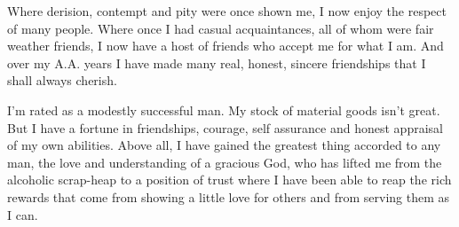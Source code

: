 \begin{biblechapter}
      Where derision, contempt and pity were once shown me, I now enjoy the respect of many people. Where once I had casual acquaintances, all of whom were fair weather friends, I now have a host of friends who accept me for what I am. And over my A.A. years I have made many real, honest, sincere friendships that I shall always cherish.

I’m rated as a modestly successful man. My stock of material goods isn’t great. But I have a fortune in friendships, courage, self assurance and honest appraisal of my own abilities. Above all, I have gained the greatest thing accorded to any man, the love and understanding of a gracious God, who has lifted me from the alcoholic scrap-heap to a position of trust where I have been able to reap the rich rewards that come from showing a little love for others and from serving them as I can.
\end{biblechapter}
